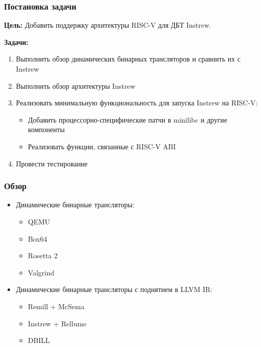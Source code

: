 \documentclass{vkr-slides-style}
\begin{document}
\begin{frame}
    \frametitle{Постановка задачи}
    \textbf{Цель:} Добавить поддержку архитектуры RISC-V для ДБТ Instrew.

    \vspace{5mm}
    \textbf{Задачи:}
    \begin{enumerate}
        \item Выполнить обзор динамических бинарных трансляторов и сравнить их с Instrew
        \item Выполнить обзор архитектуры Instrew
        \item Реализовать минимальную функциональность для запуска Instrew
              на RISC-V:
              \begin{itemize}
                  \item Добавить процессорно-специфические патчи в minilibc и другие компоненты
                  \item Реализовать функции, связанные с RISC-V ABI
              \end{itemize}
        \item Провести тестирование
    \end{enumerate}
\end{frame}

\begin{frame}
    \frametitle{Обзор}
    \begin{itemize}
        \item Динамические бинарные трансляторы:
              \begin{itemize}
                  \item QEMU
                  \item Box64
                  \item Rosetta 2
                  \item Valgrind
              \end{itemize}
        \item Динамические бинарные трансляторы с поднятием в LLVM IR:
              \begin{itemize}
                  \item Remill + McSema
                  \item Instrew + Rellume
                  \item DBILL
              \end{itemize}
    \end{itemize}
\end{frame}
\end{document}
